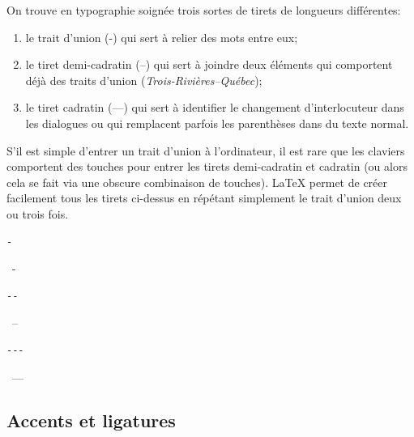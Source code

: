 {On trouve en typographie soignée trois sortes de tirets de longueurs
différentes:
\begin{enumerate}
\item le trait d'union (-) qui sert à relier des mots entre eux;
\item le tiret demi-cadratin (--) qui sert à joindre deux éléments qui
  comportent déjà des traits d'union (\emph{Trois-Rivières--Québec});
\item le tiret cadratin (---) qui sert à identifier le changement
  d'interlocuteur dans les dialogues ou qui remplacent parfois les
  parenthèses dans du texte normal.
\end{enumerate}

S'il est simple d'entrer un trait d'union à l'ordinateur, il est rare
que les claviers comportent des touches pour entrer les tirets
demi-cadratin et cadratin (ou alors cela se fait via une obscure
combinaison de touches). {\LaTeX} permet de créer facilement tous les
tirets ci-dessus en répétant simplement le trait d'union deux ou trois
fois.
\begin{demo}
  \begin{minipage}{0.2\linewidth}
    \begin{texample}
\begin{lstlisting}
-
\end{lstlisting}
      \producing\ -
    \end{texample}
  \end{minipage}
  \hfill
  \begin{minipage}{0.2\linewidth}
    \begin{texample}
\begin{lstlisting}
--
\end{lstlisting}
      \producing\ --
    \end{texample}
  \end{minipage}
  \hfill
  \begin{minipage}{0.2\linewidth}
    \begin{texample}
\begin{lstlisting}
---
\end{lstlisting}
      \producing\ ---
    \end{texample}
  \end{minipage}
\end{demo}

\subsection{Accents et ligatures}
\label{sec:bases:caracteres:accents}

}
